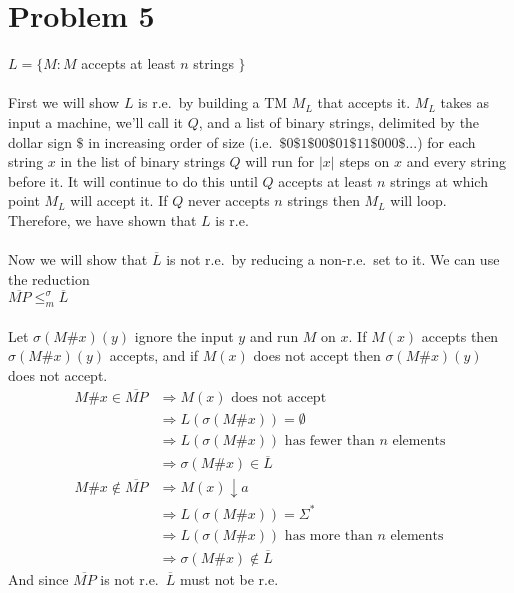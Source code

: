\documentclass[12pt]{article}
\begin{document}
\section*{Problem 5}
$L = \{M : M$ accepts at least $n$ strings $\}$\\
\\
First we will show $L$ is r.e.\ by building a TM $M_L$ that accepts it. $M_L$ takes
as input a machine, we'll call it $Q$, and a list of binary strings, delimited by 
the dollar sign $\$$ in increasing order of size (i.e.\ 
$\$0\$1\$00\$01\$11\$000\$...$) for each string $x$ in the list of binary strings
$Q$ will run for $|x|$ steps on $x$ and every string before it. It will continue
to do this until $Q$ accepts at least $n$ strings at which point $M_L$ will accept
it. If $Q$ never accepts $n$ strings then $M_L$ will loop. Therefore, we have
shown that $L$ is r.e.\\
\\
Now we will show that $\overline{L}$ is not r.e.\ by reducing a non-r.e.\ set to it.
We can use the reduction\\

$\overline{MP} \leqslant _m ^{\sigma} \overline{L}$\\
\\
Let $\sigma(M\#x)(y)$ ignore the input $y$ and run $M$ on $x$. If $M(x)$ accepts
then $\sigma(M\#x)(y)$ accepts, and if $M(x)$ does not accept then $\sigma(M\#x)(y)$
does not accept.
\begin{align*}
  M\#x \in \overline{MP} & \Rightarrow M(x) \mbox{ does not accept}\\ 
                         & \Rightarrow L(\sigma(M\#x)) = \emptyset\\
                         & \Rightarrow L(\sigma(M\#x)) \mbox{ has fewer than $n$ elements}\\
                         & \Rightarrow \sigma(M\#x) \in \overline{L}\\
  M\#x \notin \overline{MP} & \Rightarrow M(x) \downarrow a\\
                            & \Rightarrow L(\sigma(M\#x)) = \Sigma^*\\
                            & \Rightarrow L(\sigma(M\#x)) \mbox{ has more than $n$ elements}\\
                            & \Rightarrow \sigma(M\#x) \notin \overline{L}
\end{align*}
And since $\overline{MP}$ is not r.e.\ $\overline{L}$ must not be r.e.
\end{document}
